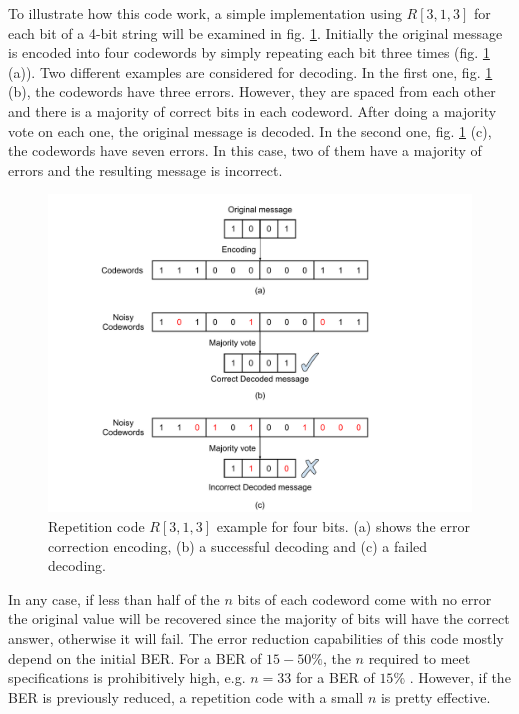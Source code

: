  To illustrate how this code work, a simple implementation using $R[3,1,3]$ for each bit of a 4-bit string will be examined in fig. \ref{fig:Repetition}. Initially the original message is encoded into four codewords by simply repeating each bit three times (fig. \ref{fig:Repetition} (a)). Two different examples are considered for decoding. In the first one, fig. \ref{fig:Repetition} (b), the codewords have three errors. However, they are spaced from each other and there is a majority of correct bits in each codeword. After doing a majority vote on each one, the original message is decoded. In the second one, fig. \ref{fig:Repetition} (c), the codewords have seven errors. In this case, two of them have a majority of errors and the resulting message is incorrect.
 
  \begin{figure}[H]
    \centering
    \includegraphics[width=13cm]{images/Repetition ECC.pdf}
    \caption{Repetition code $R[3,1,3]$ example for four bits. (a) shows the error correction encoding, (b) a successful decoding and (c) a failed decoding. }
    \label{fig:Repetition}
\end{figure}
 
In any case, if less than half of the $n$ bits of each codeword come with no error the original value will be recovered since the majority of bits will have the correct answer, otherwise it will fail. The error reduction capabilities of this code mostly depend on the initial BER. For a BER of $15-50 \%$, the $n$ required to meet specifications is prohibitively high, e.g. $n=33$ for a BER of $15\%$ \cite{Bohm2013}. However, if the BER is previously reduced, a repetition code with a small $n$ is pretty effective. 

